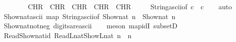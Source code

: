 \begin{isabellebody}
\ \ \ \ \ \ \ \ CHR\ {\isacharprime}{\kern0pt}{\isacharprime}{\kern0pt}{}{\isacharprime}{\kern0pt}{\isacharprime}{\kern0pt}{\isacharcomma}{\kern0pt}\ CHR\ {\isacharprime}{\kern0pt}{\isacharprime}{\kern0pt}{}{\isacharprime}{\kern0pt}{\isacharprime}{\kern0pt}{\isacharcomma}{\kern0pt}\ CHR\ {\isacharprime}{\kern0pt}{\isacharprime}{\kern0pt}{}{\isacharprime}{\kern0pt}{\isacharprime}{\kern0pt}{\isacharcomma}{\kern0pt}\ CHR\ {\isacharprime}{\kern0pt}{\isacharprime}{\kern0pt}{}{\isacharprime}{\kern0pt}{\isacharprime}{\kern0pt}{\isacharcomma}{\kern0pt}\ CHR\ {\isacharprime}{\kern0pt}{\isacharprime}{\kern0pt}{}{\isacharprime}{\kern0pt}{\isacharprime}{\kern0pt}{\isacharbraceright}{\kern0pt}\isanewline
\ \ \ {\isasymLongrightarrow}\ String{\isachardot}{\kern0pt}ascii{\isacharunderscore}{\kern0pt}of\ c\ {\isacharequal}{\kern0pt}\ c{\isacartoucheclose}\isanewline
%
\isadelimproof
\ \ %
\endisadelimproof
%
\isatagproof
{}\isamarkupfalse%
\ auto%
\endisatagproof
{\isafoldproof}%
%
\isadelimproof
\isanewline
%
\endisadelimproof
\isanewline
{}\isamarkupfalse%
\ Show\isactrlsub n\isactrlsub a\isactrlsub t{\isacharunderscore}{\kern0pt}ascii{\isacharcolon}{\kern0pt}\ {\isacartoucheopen}map\ String{\isachardot}{\kern0pt}ascii{\isacharunderscore}{\kern0pt}of\ {\isacharparenleft}{\kern0pt}Show\isactrlsub n\isactrlsub a\isactrlsub t\ n{\isacharparenright}{\kern0pt}\ {\isacharequal}{\kern0pt}\ Show\isactrlsub n\isactrlsub a\isactrlsub t\ n{\isacartoucheclose}\isanewline
%
\isadelimproof
\ \ %
\endisadelimproof
%
\isatagproof
{}\isamarkupfalse%
\ Show{\isacharunderscore}{\kern0pt}nat{\isacharunderscore}{\kern0pt}not{\isacharunderscore}{\kern0pt}neg\ digits{\isacharunderscore}{\kern0pt}are{\isacharunderscore}{\kern0pt}ascii\isanewline
\ \ \isamarkupfalse%
\ {\isacharparenleft}{\kern0pt}meson\ map{\isacharunderscore}{\kern0pt}idI\ subsetD{\isacharparenright}{\kern0pt}%
\endisatagproof
{\isafoldproof}%
%
\isadelimproof
\isanewline
%
\endisadelimproof
\isanewline
\isanewline
{}\isamarkupfalse%
\ Read{\isacharunderscore}{\kern0pt}Show{\isacharunderscore}{\kern0pt}nat{\isacharprime}{\kern0pt}{\isacharunderscore}{\kern0pt}id{\isacharcolon}{\kern0pt}\ {\isacartoucheopen}ReadL\isactrlsub n\isactrlsub a\isactrlsub t{\isacharparenleft}{\kern0pt}ShowL\isactrlsub n\isactrlsub a\isactrlsub t\ n{\isacharparenright}{\kern0pt}\ {\isacharequal}{\kern0pt}\ n{\isacartoucheclose}\isanewline
%
\isadelimproof
\ \ %
\endisadelimproof
%
\isatagproof
{}\isamarkupfalse%

\end{isabellebody}
